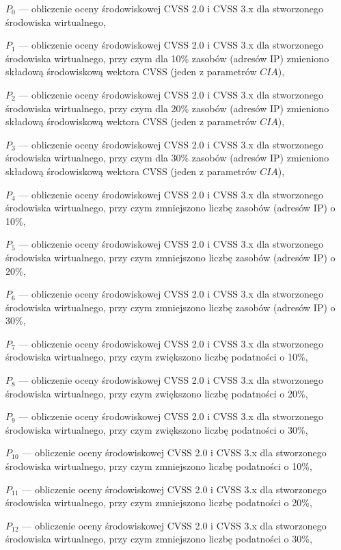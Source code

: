 \begin{description}
    \item $P_0$ — obliczenie oceny środowiskowej CVSS 2.0 i CVSS 3.x dla stworzonego środowiska wirtualnego,
    \item $P_1$ — obliczenie oceny środowiskowej CVSS 2.0 i CVSS 3.x dla stworzonego środowiska wirtualnego, przy czym dla 10\% zasobów (adresów IP) zmieniono składową środowiskową wektora CVSS (jeden z parametrów $CIA$),
    \item $P_2$ — obliczenie oceny środowiskowej CVSS 2.0 i CVSS 3.x dla stworzonego środowiska wirtualnego, przy czym dla 20\% zasobów (adresów IP) zmieniono składową środowiskową wektora CVSS (jeden z parametrów $CIA$),
    \item $P_3$ — obliczenie oceny środowiskowej CVSS 2.0 i CVSS 3.x dla stworzonego środowiska wirtualnego, przy czym dla 30\% zasobów (adresów IP) zmieniono składową środowiskową wektora CVSS (jeden z parametrów $CIA$),
    \item $P_4$ — obliczenie oceny środowiskowej CVSS 2.0 i CVSS 3.x dla stworzonego środowiska wirtualnego, przy czym zmniejszono liczbę zasobów (adresów IP) o 10\%,
    \item $P_5$ — obliczenie oceny środowiskowej CVSS 2.0 i CVSS 3.x dla stworzonego środowiska wirtualnego, przy czym zmniejszono liczbę zasobów (adresów IP) o 20\%,
    \item $P_6$ — obliczenie oceny środowiskowej CVSS 2.0 i CVSS 3.x dla stworzonego środowiska wirtualnego, przy czym zmniejszono liczbę zasobów (adresów IP) o 30\%,
    \item $P_7$ — obliczenie oceny środowiskowej CVSS 2.0 i CVSS 3.x dla stworzonego środowiska wirtualnego, przy czym zwiększono liczbę podatności o 10\%,
    \item $P_8$ — obliczenie oceny środowiskowej CVSS 2.0 i CVSS 3.x dla stworzonego środowiska wirtualnego, przy czym zwiększono liczbę podatności o 20\%,
    \item $P_9$ — obliczenie oceny środowiskowej CVSS 2.0 i CVSS 3.x dla stworzonego środowiska wirtualnego, przy czym zwiększono liczbę podatności o 30\%,
    \item $P_{10}$ — obliczenie oceny środowiskowej CVSS 2.0 i CVSS 3.x dla stworzonego środowiska wirtualnego, przy czym zmniejszono liczbę podatności o 10\%,
    \item $P_{11}$ — obliczenie oceny środowiskowej CVSS 2.0 i CVSS 3.x dla stworzonego środowiska wirtualnego, przy czym zmniejszono liczbę podatności o 20\%,
    \item $P_{12}$ — obliczenie oceny środowiskowej CVSS 2.0 i CVSS 3.x dla stworzonego środowiska wirtualnego, przy czym zmniejszono liczbę podatności o 30\%,
\end{description}

